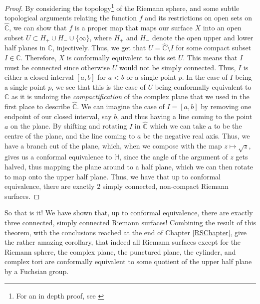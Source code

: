 \documentclass[11pt]{report}
\theoremstyle{definition}
\begin{document}
\begin{proof}
By considering the topology\footnote{For an in depth proof, see \cite[p.132-133]{donaldson}} of the Riemann sphere, and some subtle topological arguments relating the function $f$ and its restrictions on open sets on $\widehat{\mathbb{C}}$, we can show that $f$ is a proper map that maps our surface $X$ into an open subset $U \subset H_+\cup H_- \cup \{\infty\}$, where $H_+$ and $H_-$ denote the open upper and lower half planes in $\mathbb{C}$, injectively. Thus, we get that $U = \widehat{\mathbb{C}}\setminus I$ for some compact subset $I \in \mathbb{C}$. Therefore, $X$ is conformally equivalent to this set $U$. This means that $I$ must be connected since otherwise $U$ would not be simply connected. Thus, $I$ is either a closed interval $[a,b]$ for $a < b$ or a single point $p$. In the case of $I$ being a single point $p$, we see that this is the case of $U$ being conformally equivalent to $\mathbb{C}$ as it is undoing the \emph{compactification} of the complex plane that we used in the first place to describe $\widehat{\mathbb{C}}$. We can imagine the case of $I=[a,b]$ by removing one endpoint of our closed interval, say $b$, and thus having a line coming to the point $a$ on the plane. By shifting and rotating $I$ in $\widehat{\mathbb{C}}$ which we can take $a$ to be the centre of the plane, and the line coming to $a$ be the negative real axis. Thus, we have a branch cut of the plane, which, when we compose with the map $z \mapsto \sqrt{z}$, gives us a conformal equivalence to $\mathbb{H}$, since the angle of the argument of $z$ gets halved, thus mapping the plane around to a half plane, which we can then rotate to map onto the upper half plane. Thus, we have that up to conformal equivalence, there are exactly $2$ simply connected, non-compact Riemann surfaces.
\end{proof}

So that is it! We have shown that, up to conformal equivalence, there are exactly three connected, simply connected Riemann surfaces! Combining the result of this theorem, with the conclusions reached at the end of Chapter \ref{RSChapter}, give the rather amazing corollary, that indeed all Riemann surfaces except for the Riemann sphere, the complex plane, the punctured plane, the cylinder, and complex tori are conformally equivalent to some quotient of the upper half plane by a Fuchsian group.
\end{document}
